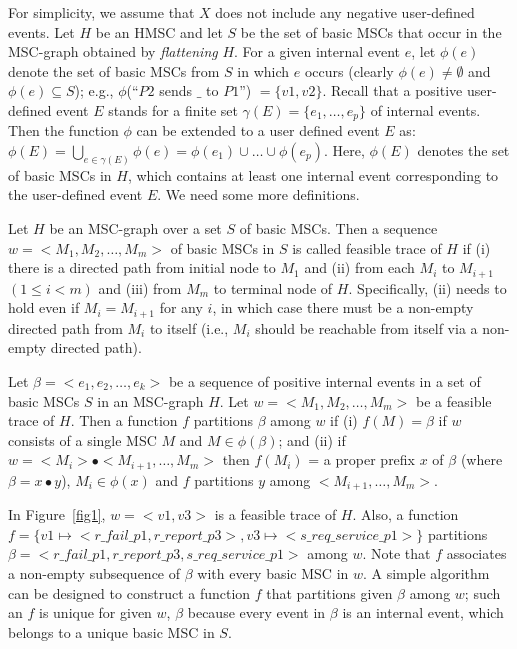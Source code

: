\documentclass{entcs}
\begin{document}
For simplicity, we assume that $X$ does not include 
any negative user-defined events. Let $H$ be an HMSC 
and let $S$ be the set of basic MSCs that occur in the 
MSC-graph obtained by {\em flattening} $H$. For a 
given internal event $e$, let $\phi(e)$ denote the 
set of basic MSCs from $S$ in which $e$ occurs 
(clearly $\phi(e) \neq \emptyset$ and $\phi(e) \subseteq S$); 
e.g., $\phi$(``$P2$ sends $\_$ to $P1$'') $= \{v1,v2\}$. 
Recall that a positive user-defined event $E$ stands 
for a finite set $\gamma(E) = \{e_1,\ldots,e_p\}$ of 
internal events. Then the function $\phi$ can be extended 
to a user defined event $E$ as: 
$\phi(E) = \bigcup_{e \in \gamma(E)} \phi(e) = 
\phi(e_1) \cup \ldots \cup \phi(e_p)$. Here, $\phi(E)$ denotes 
the set of basic MSCs in $H$, which contains at least 
one internal event corresponding to the user-defined 
event $E$. We need some more definitions.

\begin{definition}
\label{feasibletrace}
Let $H$ be an MSC-graph over a set $S$ of basic MSCs. 
Then a sequence $w = <M_1,M_2,\ldots,M_m>$ of basic MSCs 
in $S$ is called feasible trace of $H$ if (i) there is a 
directed path from initial node to $M_1$ and (ii) 
from each $M_i$ to $M_{i+1}$ $(1 \leq i < m)$ and 
(iii) from $M_m$ to terminal node of $H$. Specifically, 
(ii) needs to hold even if $M_i = M_{i+1}$ for any $i$, 
in which case there must be a non-empty directed path 
from $M_i$ to itself (i.e., $M_i$ should be reachable 
from itself via a non-empty directed path). 
\end{definition}

\begin{definition}
\label{fpartition}
Let $\beta = <e_1,e_2,\ldots,e_k>$ be a sequence of positive 
internal events in a set of basic MSCs $S$ in an MSC-graph 
$H$. Let $w = <M_1,M_2,\ldots,M_m>$ be a feasible trace of $H$. 
Then a function $f$ partitions $\beta$ among $w$ if 
(i) $f(M) = \beta$ if $w$ consists of a single MSC $M$ 
and $M \in \phi(\beta)$; and 
(ii) if $w = <M_i> \bullet <M_{i+1},\ldots,M_m>$ then 
$f(M_i)$ = a proper prefix $x$ of $\beta$ (where 
$\beta = x \bullet y$), $M_i \in \phi(x)$ and $f$ 
partitions $y$ among $<M_{i+1},\ldots,M_m>$.
\end{definition}

In Figure~\ref{fig1}, $w = <v1,v3>$ is a feasible trace of $H$. 
Also, a function $f = \{v1 \mapsto <r\_fail\_p1,r\_report\_p3>, 
v3 \mapsto <s\_req\_service\_p1>\}$ partitions 
$\beta = <r\_fail\_p1,r\_report\_p3,s\_req\_service\_p1>$ 
among $w$. Note that $f$ associates a non-empty subsequence 
of $\beta$ with every basic MSC in $w$. A simple algorithm 
can be designed to construct a function $f$ that partitions 
given $\beta$ among $w$; such an $f$ is unique for given $w$, 
$\beta$ because every event in $\beta$ is an internal event, 
which belongs to a unique basic MSC in $S$.
\end{document}
